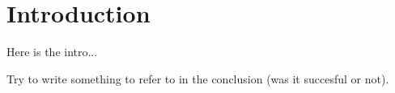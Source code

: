 \chapter{Introduction}\label{chap:Intro}

Here is the intro...

Try to write something to refer to in the conclusion (was it succesful or not).
